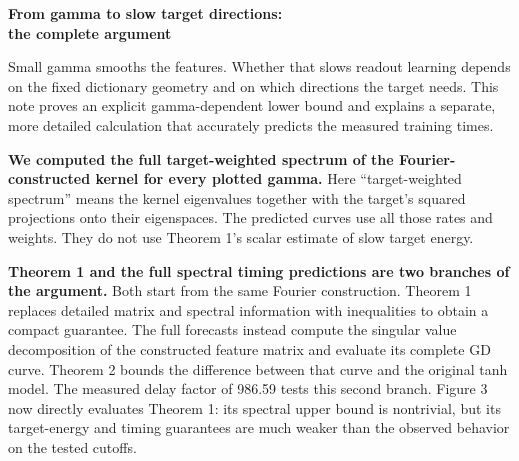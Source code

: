 \documentclass[11pt]{article}
\theoremstyle{definition}
\begin{document}
\thispagestyle{plain}
{\color{ink}\fontsize{23}{26}\selectfont\bfseries From gamma to slow target directions:\\the complete argument\par}
\vspace{8pt}
Small gamma smooths the features. Whether that slows readout learning depends
on the fixed dictionary geometry and on which directions the target needs.
This note proves an explicit gamma-dependent lower bound and explains a
separate, more detailed calculation that accurately predicts the measured
training times.

\textbf{We computed the full target-weighted spectrum of the Fourier-constructed
kernel for every plotted gamma.} Here ``target-weighted spectrum'' means the
kernel eigenvalues together with the target's squared projections onto their
eigenspaces. The predicted curves use all those rates and weights. They do not
use Theorem 1's scalar estimate of slow target energy.

\textbf{Theorem 1 and the full spectral timing predictions are two branches of the
argument.} Both start from the same Fourier construction. Theorem 1 replaces
detailed matrix and spectral information with inequalities to obtain a compact
guarantee. The full forecasts instead compute the singular value
decomposition of the constructed feature matrix and evaluate its complete GD curve. Theorem 2 bounds
the difference between that curve and the original tanh model. The measured
delay factor of 986.59 tests this second branch. Figure 3 now directly evaluates
Theorem 1: its spectral upper bound is nontrivial, but its target-energy and
timing guarantees are much weaker than the observed behavior on the tested
cutoffs.
\end{document}
